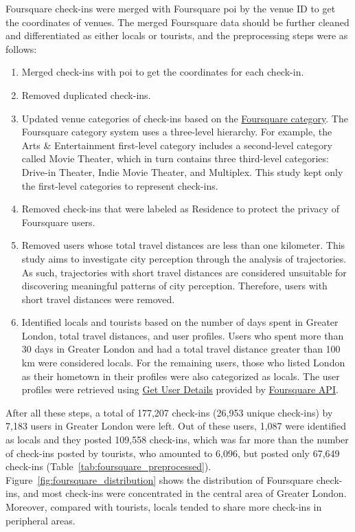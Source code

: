 \documentclass{article}
\begin{document}
Foursquare check-ins were merged with Foursquare \acrshort{poi} by the venue ID to get the coordinates of venues. The merged Foursquare data should be further cleaned and differentiated as either locals or tourists, and the preprocessing steps were as follows:
\begin{enumerate}
    \item Merged check-ins with \acrshort{poi} to get the coordinates for each check-in.
    \item Removed duplicated check-ins.
    \item Updated venue categories of check-ins based on the \href{http://foursquare-categories.herokuapp.com/}{ Foursquare category}. The Foursquare category system uses a three-level hierarchy. For example, the Arts \& Entertainment first-level category includes a second-level category called Movie Theater, which in turn contains three third-level categories: Drive-in Theater, Indie Movie Theater, and Multiplex. This study kept only the first-level categories to represent 
    check-ins.
    \item Removed check-ins that were labeled as Residence to protect the privacy of Foursquare users.
    \item Removed users whose total travel distances are less than one kilometer. This study aims to investigate city perception through the analysis of trajectories. As such, trajectories with short travel distances are considered unsuitable for discovering meaningful patterns of city perception. Therefore, users with short travel distances were removed.
    \item Identified locals and tourists based on the number of days spent in Greater London, total travel distances, and user profiles. Users who spent more than 30 days in Greater London and had a total travel distance greater than 100 km were considered locals. For the remaining users, those who listed London as their hometown in their profiles were also categorized as locals. The user profiles were retrieved using \href{https://location.foursquare.com/developer/reference/v2-users-user_id}{Get User Details} provided by \href{https://location.foursquare.com/developer/reference/foursquare-api-overview}{Foursquare API}.
\end{enumerate}

After all these steps, a total of 177,207 check-ins (26,953 unique check-ins) by 7,183 users in Greater London were left. Out of these users, 1,087 were identified as locals and they posted 109,558 check-ins, which was far more than the number of check-ins posted by tourists, who amounted to 6,096, but posted only 67,649 check-ins (Table~\ref{tab:foursquare_preprocessed}). Figure~\ref{fig:foursquare_distribution} shows the distribution of Foursquare check-ins, and most check-ins were concentrated in the central area of Greater London. Moreover, compared with tourists, locals tended to share more check-ins in peripheral areas.
\end{document}
